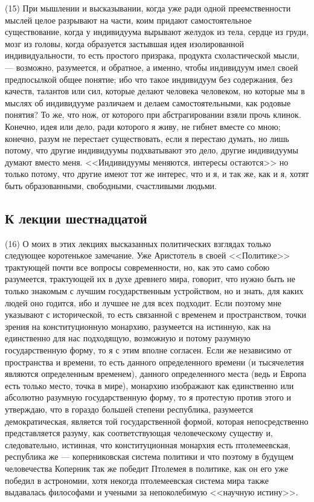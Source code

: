 \documentclass[12pt]{article}
\begin{document}
(15) При мышлении и высказывании, когда уже ради одной преемственности мыслей целое разрывают на части, коим придают самостоятельное существование, когда у индивидуума вырывают желудок из тела, сердце из груди, мозг из головы, когда образуется застывшая идея изолированной индивидуальности, то есть простого призрака, продукта схоластической мысли, --- возможно, разумеется, и обратное, а именно, чтобы индивидуум имел своей предпосылкой общее понятие; ибо что такое индивидуум без содержания, без качеств, талантов или сил, которые делают человека человеком, но которые мы в мыслях об индивидууме различаем и делаем самостоятельными, как родовые понятия? То же, что нож, от которого при абстрагировании взяли прочь клинок. Конечно, идея или дело, ради которого я живу, не гибнет вместе со мною; конечно, разум не перестает существовать, если я перестаю думать, но лишь потому, что другие индивидуумы подхватывают это дело, другие индивидуумы думают вместо меня. <<Индивидуумы меняются, интересы остаются>>  но только потому, что другие имеют тот же интерес, что и я, и так же, как и я, хотят быть образованными, свободными, счастливыми людьми. 

\subsection*{К лекции шестнадцатой} 

(16) О моих в этих лекциях высказанных политических взглядах только следующее коротенькое замечание. Уже Аристотель в своей <<Политике>>  трактующей почти все вопросы современности, но, как это само собою разумеется, трактующей их в духе древнего мира, говорит, что нужно быть не только знакомым с лучшим государственным устройством, но и знать, для каких людей оно годится, ибо и лучшее не для всех подходит. Если поэтому мне указывают с исторической, то есть связанной с временем и пространством, точки зрения на конституционную монархию, разумеется на истинную, как на единственно для нас подходящую, возможную и потому разумную государственную форму, то я с этим вполне согласен. Если же независимо от пространства и времени, то есть данного определенного времени (и тысячелетия являются определенным временем), данного определенного места (ведь и Европа есть только место, точка в мире), монархию изображают как единственно или абсолютно разумную государственную форму, то я протестую против этого и утверждаю, что в гораздо большей степени республика, разумеется демократическая, является той государственной формой, которая непосредственно представляется разуму, как соответствующая человеческому существу и, следовательно, истинная, что конституционная монархия есть птолемеевская, республика же --- коперниковская система политики и что поэтому в будущем человечества Коперник так же победит Птолемея в политике, как он его уже победил в астрономии, хотя некогда птолемеевская система мира также выдавалась философами и учеными за непоколебимую <<научную истину>>. 
\end{document}
